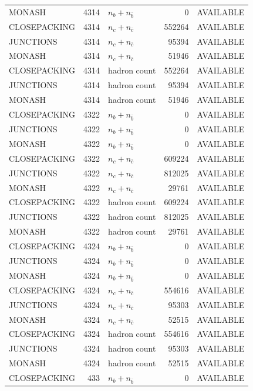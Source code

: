 \begin{landscape}
\begin{longtable}{@{}lrlrl@{}}
MONASH & 4314 & $n_b+n_{\bar b}$ & \num{0} & AVAILABLE \\
CLOSEPACKING & 4314 & $n_c+n_{\bar c}$ & \num{552264} & AVAILABLE \\
JUNCTIONS & 4314 & $n_c+n_{\bar c}$ & \num{95394} & AVAILABLE \\
MONASH & 4314 & $n_c+n_{\bar c}$ & \num{51946} & AVAILABLE \\
CLOSEPACKING & 4314 & hadron count & \num{552264} & AVAILABLE \\
JUNCTIONS & 4314 & hadron count & \num{95394} & AVAILABLE \\
MONASH & 4314 & hadron count & \num{51946} & AVAILABLE \\
CLOSEPACKING & 4322 & $n_b+n_{\bar b}$ & \num{0} & AVAILABLE \\
JUNCTIONS & 4322 & $n_b+n_{\bar b}$ & \num{0} & AVAILABLE \\
MONASH & 4322 & $n_b+n_{\bar b}$ & \num{0} & AVAILABLE \\
CLOSEPACKING & 4322 & $n_c+n_{\bar c}$ & \num{609224} & AVAILABLE \\
JUNCTIONS & 4322 & $n_c+n_{\bar c}$ & \num{812025} & AVAILABLE \\
MONASH & 4322 & $n_c+n_{\bar c}$ & \num{29761} & AVAILABLE \\
CLOSEPACKING & 4322 & hadron count & \num{609224} & AVAILABLE \\
JUNCTIONS & 4322 & hadron count & \num{812025} & AVAILABLE \\
MONASH & 4322 & hadron count & \num{29761} & AVAILABLE \\
CLOSEPACKING & 4324 & $n_b+n_{\bar b}$ & \num{0} & AVAILABLE \\
JUNCTIONS & 4324 & $n_b+n_{\bar b}$ & \num{0} & AVAILABLE \\
MONASH & 4324 & $n_b+n_{\bar b}$ & \num{0} & AVAILABLE \\
CLOSEPACKING & 4324 & $n_c+n_{\bar c}$ & \num{554616} & AVAILABLE \\
JUNCTIONS & 4324 & $n_c+n_{\bar c}$ & \num{95303} & AVAILABLE \\
MONASH & 4324 & $n_c+n_{\bar c}$ & \num{52515} & AVAILABLE \\
CLOSEPACKING & 4324 & hadron count & \num{554616} & AVAILABLE \\
JUNCTIONS & 4324 & hadron count & \num{95303} & AVAILABLE \\
MONASH & 4324 & hadron count & \num{52515} & AVAILABLE \\
CLOSEPACKING & 433 & $n_b+n_{\bar b}$ & \num{0} & AVAILABLE \\

\end{longtable}
\end{landscape}
